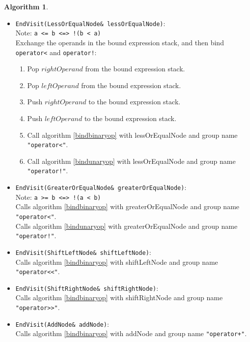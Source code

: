 \documentclass[a4paper,oneside,11pt]{book}
\theoremstyle{definition}
\newtheorem{algo}{Algorithm}[section]
\begin{document}
\begin{algo}
\begin{itemize}
\begin{enumerate}
Push $rightOperand$ to the bound expression stack.
\item
Push $leftOperand$ to the bound expression stack.
\item
Call algorithm \ref{bindbinaryop} with greaterNode and group name \verb|"operator<"|.
\end{enumerate}
\item
\verb|EndVisit(LessOrEqualNode& lessOrEqualNode)|:\\
Note: \verb|a <= b <=> !(b < a)|\\
Exchange the operands in the bound expression stack, and then bind \verb|operator<| and \verb|operator!|:
\begin{enumerate}
\item
Pop $rightOperand$ from the bound expression stack.
\item
Pop $leftOperand$ from the bound expression stack.
\item
Push $rightOperand$ to the bound expression stack.
\item
Push $leftOperand$ to the bound expression stack.
\item
Call algorithm \ref{bindbinaryop} with lessOrEqualNode and group name \verb|"operator<"|.
\item
Call algorithm \ref{bindunaryop} with lessOrEqualNode and group name \verb|"operator!"|.
\end{enumerate}
\item
\verb|EndVisit(GreaterOrEqualNode& greaterOrEqualNode)|:\\
Note: \verb|a >= b <=> !(a < b)|\\
Calls algorithm \ref{bindbinaryop} with greaterOrEqualNode and group name \verb|"operator<"|.\\
Calls algorithm \ref{bindunaryop} with greaterOrEqualNode and group name \verb|"operator!"|.\\
\item
\verb|EndVisit(ShiftLeftNode& shiftLeftNode)|:\\
Calls algorithm \ref{bindbinaryop} with shiftLeftNode and group name \verb|"operator<<"|.\\
\item
\verb|EndVisit(ShiftRightNode& shiftRightNode)|:\\
Calls algorithm \ref{bindbinaryop} with shiftRightNode and group name \verb|"operator>>"|.\\
\item
\verb|EndVisit(AddNode& addNode)|:\\
Calls algorithm \ref{bindbinaryop} with addNode and group name \verb|"operator+"|.\\

\end{itemize}
\end{algo}
\end{document}
